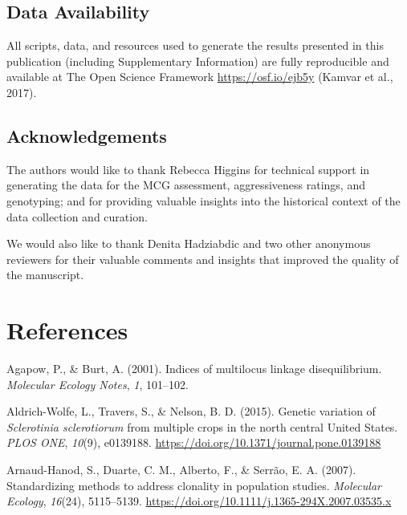 \subsection*{Data Availability}\label{data-availability}

All scripts, data, and resources used to generate the results presented
in this publication (including Supplementary Information) are fully
reproducible and available at The Open Science Framework
\url{https://osf.io/ejb5y} (Kamvar et al., 2017).

\subsection*{Acknowledgements}\label{acknowledgements}

The authors would like to thank Rebecca Higgins for technical support in
generating the data for the MCG assessment, aggressiveness ratings, and
genotyping; and for providing valuable insights into the historical
context of the data collection and curation.

We would also like to thank Denita Hadziabdic and two other anonymous
reviewers for their valuable comments and insights that improved the
quality of the manuscript.

\newpage

\section*{References}\label{references}

\hypertarget{refs}{}
\hypertarget{ref-agapow2001indices}{}
Agapow, P., \& Burt, A. (2001). Indices of multilocus linkage
disequilibrium. \emph{Molecular Ecology Notes}, \emph{1}, 101--102.

\hypertarget{ref-aldrich-wolfe2015genetic}{}
Aldrich-Wolfe, L., Travers, S., \& Nelson, B. D. (2015). Genetic
variation of \emph{Sclerotinia sclerotiorum} from multiple crops in the
north central United States. \emph{PLOS ONE}, \emph{10}(9), e0139188.
\url{https://doi.org/10.1371/journal.pone.0139188}

\hypertarget{ref-arnaud2007standardizing}{}
Arnaud-Hanod, S., Duarte, C. M., Alberto, F., \& Serrão, E. A. (2007).
Standardizing methods to address clonality in population studies.
\emph{Molecular Ecology}, \emph{16}(24), 5115--5139.
\url{https://doi.org/10.1111/j.1365-294X.2007.03535.x}


